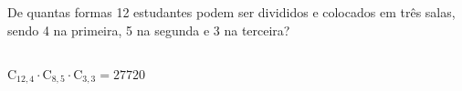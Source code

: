 \begin{ex}
 De quantas formas 12 estudantes podem ser divididos e colocados em três salas, sendo 4 na primeira, 5 na segunda e 3 na terceira?
   \begin{sol}
       \phantom{A} \\
     $\mathrm{C}_{{12},4}\cdot \mathrm{C}_{8,5}\cdot \mathrm{C}_{3,3}=27720$
   \end{sol}
\end{ex}